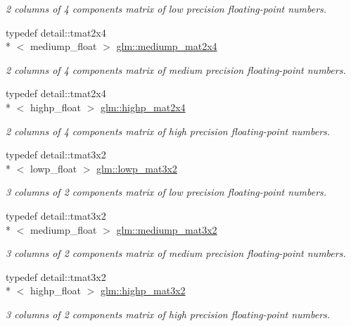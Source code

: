\begin{DoxyCompactItemize}
\begin{DoxyCompactList}\small\item\em 2 columns of 4 components matrix of low precision floating-\/point numbers. \end{DoxyCompactList}\item 
typedef detail\-::tmat2x4\\*
$<$ mediump\-\_\-float $>$ \hyperlink{group__core__precision_ga2e80caa3f70e504bd574664b1029e627}{glm\-::mediump\-\_\-mat2x4}
\begin{DoxyCompactList}\small\item\em 2 columns of 4 components matrix of medium precision floating-\/point numbers. \end{DoxyCompactList}\item 
typedef detail\-::tmat2x4\\*
$<$ highp\-\_\-float $>$ \hyperlink{group__core__precision_ga41deb7c45e9219ccccdc011aafd42f27}{glm\-::highp\-\_\-mat2x4}
\begin{DoxyCompactList}\small\item\em 2 columns of 4 components matrix of high precision floating-\/point numbers. \end{DoxyCompactList}\item 
typedef detail\-::tmat3x2\\*
$<$ lowp\-\_\-float $>$ \hyperlink{group__core__precision_ga590ba3600da3c6dc36a0eb7574cbd6f6}{glm\-::lowp\-\_\-mat3x2}
\begin{DoxyCompactList}\small\item\em 3 columns of 2 components matrix of low precision floating-\/point numbers. \end{DoxyCompactList}\item 
typedef detail\-::tmat3x2\\*
$<$ mediump\-\_\-float $>$ \hyperlink{group__core__precision_ga74c660239e7f6b76796f1b4990083ec6}{glm\-::mediump\-\_\-mat3x2}
\begin{DoxyCompactList}\small\item\em 3 columns of 2 components matrix of medium precision floating-\/point numbers. \end{DoxyCompactList}\item 
typedef detail\-::tmat3x2\\*
$<$ highp\-\_\-float $>$ \hyperlink{group__core__precision_gae46e3b35f72ae06bc7d38ff29a189cfb}{glm\-::highp\-\_\-mat3x2}
\begin{DoxyCompactList}\small\item\em 3 columns of 2 components matrix of high precision floating-\/point numbers. \end{DoxyCompactList}\item 

\end{DoxyCompactItemize}
